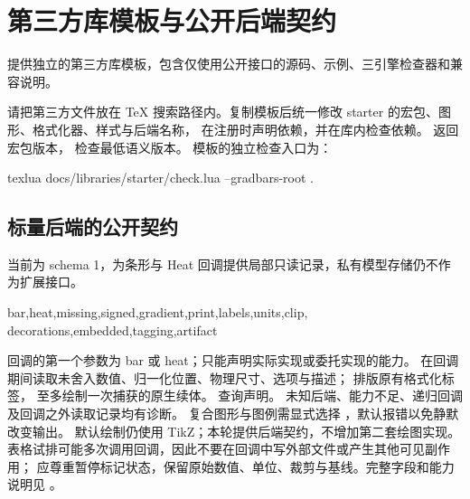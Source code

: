 \section{第三方库模板与公开后端契约}
 提供独立的第三方库模板，包含仅使用公开接口的源码、示例、三引擎检查器和兼容说明。
\begin{codeonly}
\usepackage[libraries=none]{gradbars}
\end{codeonly}
请把第三方文件放在 TeX 搜索路径内。复制模板后统一修改 starter 的宏包、图形、格式化器、样式与后端名称，
在注册时声明依赖，并在库内检查依赖。
\key{\gradbarsversion} 返回宏包版本， 检查最低语义版本。
模板的独立检查入口为：
\begin{codeonly}
texlua docs/libraries/starter/check.lua --gradbars-root .
\end{codeonly}
\subsection{标量后端的公开契约}
\key{\gradbarsbackendversion} 当前为 schema 1，为条形与 Heat 回调提供局部只读记录，私有模型存储仍不作为扩展接口。
\begin{codeonly}
 {bar,heat,missing,signed,gradient,print,labels,units,clip,
  decorations,embedded,tagging,artifact}
 {\gradbarsbackenddefault}
\end{codeonly}
回调的第一个参数为 bar 或 heat；只能声明实际实现或委托实现的能力。
 在回调期间读取未舍入数值、归一化位置、物理尺寸、选项与描述；
\key{\gradbarsbackendlabel} 排版原有格式化标签，\key{\gradbarsbackenddefault} 至多绘制一次捕获的原生续体。
 查询声明。
未知后端、能力不足、递归回调及回调之外读取记录均有诊断。
复合图形与图例需显式选择 ，默认报错以免静默改变输出。
默认绘制仍使用 TikZ；本轮提供后端契约，不增加第二套绘图实现。
表格试排可能多次调用回调，因此不要在回调中写外部文件或产生其他可见副作用；
应尊重暂停标记状态，保留原始数值、单位、裁剪与基线。完整字段和能力说明见 。
